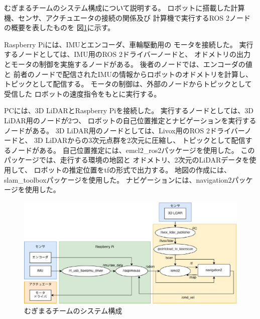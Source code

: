 むぎまるチームのシステム構成について説明する。
ロボットに搭載した計算機、センサ、アクチュエータの接続の関係及び
計算機で実行するROS 2ノードの概要を表したものを
図\ref{fig:mugimaru_system}に示す。

Raspberry Piには、IMUとエンコーダ、車輪駆動用の
モータを接続した。
実行するノードとしては、IMU用のROS 2ドライバーノードと、
オドメトリの出力とモータの制御を実施するノードがある。
後者のノードでは、エンコーダの値と
前者のノードで配信されたIMUの情報からロボットのオドメトリを計算し、
トピックとして配信する。
モータの制御は、外部のノードからトピックとして受信した
ロボットの速度指令をもとに実行する。

PCには、3D LiDARとRaspberry Piを接続した。
実行するノードとしては、3D LiDAR用のノードが2つ、
ロボットの自己位置推定とナビゲーションを実行するノードがある。
3D LiDAR用のノードとしては、Livox用のROS 2ドライバーノードと、
3D LiDARからの3次元点群を2次元に圧縮し、
トピックとして配信するノードがある。
自己位置推定には、emcl2\_ros2パッケージ\cite{emcl2_ros2}を使用した。
このパッケージでは、走行する環境の地図と
オドメトリ、2次元のLiDARデータを使用して、
ロボットの推定位置をtfの形式で出力する。
地図の作成には、slam\_toolboxパッケージ\cite{slam_toolbox}を使用した。
ナビゲーションには、navigation2パッケージ\cite{nav2}を使用した。



\begin{figure}[h]
  \begin{center}
    \includegraphics[width=1.0\linewidth]{figs/mugimaru_system_2024.eps}
    \caption{むぎまるチームのシステム構成}
    \label{fig:mugimaru_system}
  \end{center}
\end{figure}

